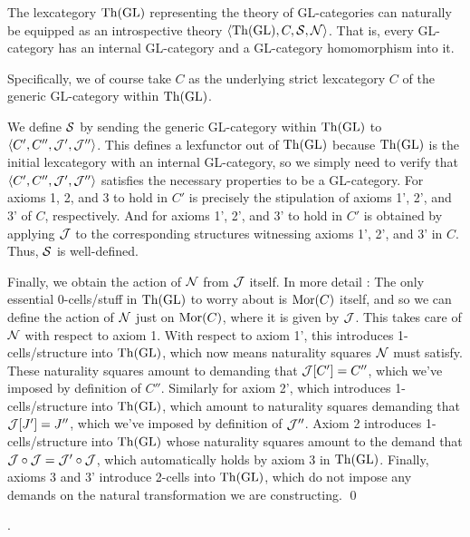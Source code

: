 \begin{construction}
The lexcategory $\mathrm{Th}(\mathrm{GL})$ representing the theory of GL-categories can naturally be equipped as an introspective theory $\langle \mathrm{Th}(\mathrm{GL}), C, \mathcal{S}, \mathcal{N} \rangle$. That is, every GL-category has an internal GL-category and a GL-category homomorphism into it.

Specifically, we of course take $C$ as the underlying strict lexcategory $C$ of the generic GL-category within $\mathrm{Th}(\mathrm{GL})$.

We define $\mathcal{S}$ by sending the generic GL-category within $\mathrm{Th}(\mathrm{GL})$ to $\langle C', C'', \mathcal{J}', \mathcal{J}'' \rangle$. This defines a lexfunctor out of $\mathrm{Th}(\mathrm{GL})$ because $\mathrm{Th}(\mathrm{GL})$ is the initial lexcategory with an internal GL-category, so we simply need to verify that $\langle C', C'', \mathcal{J}', \mathcal{J}'' \rangle$ satisfies the necessary properties to be a GL-category. For axioms 1, 2, and 3 to hold in $C'$ is precisely the stipulation of axioms 1', 2', and 3' of $C$, respectively. And for axioms 1', 2', and 3' to hold in $C'$ is obtained by applying $\mathcal{J}$ to the corresponding structures witnessing axioms 1', 2', and 3' in $C$. Thus, $\mathcal{S}$ is well-defined.

Finally, we obtain the action of $\mathcal{N}$ from $\mathcal{J}$ itself. In more detail : The only essential 0-cells/stuff in $\mathrm{Th}(\mathrm{GL})$ to worry about is $\operatorname{Mor}(C)$ itself, and so we can define the action of $\mathcal{N}$ just on $\operatorname{Mor}(C)$, where it is given by $\mathcal{J}$. This takes care of $\mathcal{N}$ with respect to axiom 1. With respect to axiom 1', this introduces 1-cells/structure into $\mathrm{Th}(\mathrm{GL})$, which now means naturality squares $\mathcal{N}$ must satisfy. These naturality squares amount to demanding that $\mathcal{J}[C'] = C''$, which we've imposed by definition of $C''$. Similarly for axiom 2', which introduces 1-cells/structure into $\mathrm{Th}(\mathrm{GL})$, which amount to naturality squares demanding that $\mathcal{J}[J'] = J''$, which we've imposed by definition of $\mathcal{J}''$. Axiom 2 introduces 1-cells/structure into $\mathrm{Th}(\mathrm{GL})$ whose naturality squares amount to the demand that $\mathcal{J} \circ \mathcal{J} = \mathcal{J}' \circ \mathcal{J}$, which automatically holds by axiom 3 in $\mathrm{Th}(\mathrm{GL})$. Finally, axioms 3 and 3' introduce 2-cells into $\mathrm{Th}(\mathrm{GL})$, which do not impose any demands on the natural transformation we are constructing. \qed

.
\end{construction}

